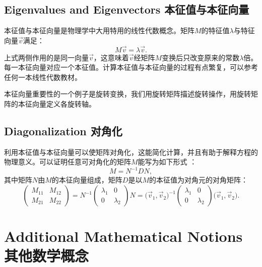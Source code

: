 \section[本征值与本征向量]{Eigenvalues and Eigenvectors 本征值与本征向量}
\label{appendix.C.4}
本征值与本征向量是物理学中大用特用的线性代数概念。矩阵$M$的特征值$\lambda$与特征向量$\vec{v}$满足：
\begin{equation}
\label{equC.8}
	M \vec{v} = \lambda \vec{v}.
\end{equation}
上式两侧作用的是同一向量$\vec{v}$，这意味着$\vec{v}$经矩阵$M$变换后只改变原来的常数$\lambda$倍。每一本征向量对应一个本征值。计算本征值与本征向量的过程有点繁复，可以参考任何一本线性代数教材。

本征向量重要性的一个例子是旋转变换，我们用旋转矩阵描述旋转操作，用旋转矩阵的本征向量定义各旋转轴。


\section[对角化]{Diagonalization 对角化}
\label{appendix.C.5}
利用本征值与本征向量可以使矩阵对角化，这能简化计算，并且有助于解释方程的物理意义。可以证明任意可对角化的矩阵$M$能写为如下形式%
%
：
\begin{equation}
\label{equC.9}
	M = N^{-1} D N,
\end{equation}
其中矩阵$N$由$M$的本征向量组成，矩阵$D$是以$M$的本征值为对角元的对角矩阵：
\begin{equation}
\label{equC.10}
	\begin{pmatrix}
		M_{11} & M_{12} \\
		M_{21} & M_{22}
	\end{pmatrix}
	= N^{-1}
		\begin{pmatrix}
			\lambda_1 & 0 \\
			0 & \lambda_2
		\end{pmatrix}
	N = \Big( \vec{v}_1, \vec{v}_2 \Big)^{-1}
		\begin{pmatrix}
			\lambda_1 & 0 \\
			0 & \lambda_2
		\end{pmatrix}
	\Big( \vec{v}_1, \vec{v}_2 \Big).
\end{equation}


\chapter[其他数学概念]{Additional Mathematical
Notions \quad 其他数学概念}\label{appendix.D}
